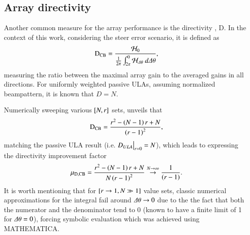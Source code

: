 \subsection*{Array directivity}
Another common measure for the array performance is the directivity \cite{VanTrees2002DetectionIV}, $\text{D}$. In the context of this work, considering the steer error scenario, it is defined as
\begin{equation*}
    \text{D}_{\coefSetName{}} = \frac{\Hr_{0}}{\frac{1}{2\pi}\int^{0}_{2\pi}\Hr_{\dTheta}\ d\dTheta},
\end{equation*}
measuring the ratio between the maximal array gain to the averaged gains in all directions. For uniformly weighted passive ULAs, assuming normalized beampattern, it is known \cite{VanTrees2002DetectionIV} that $D = N$.
\par Numerically sweeping various $\left[{N,r}\right]$ sets, unveils that
\begin{equation}
    \text{D}_{\text{CB}{}} = \frac{r^{2}-\left({N-1}\right)r+N}{\left({r-1}\right)^{2}},
\end{equation}
matching the passive ULA result (i.e. $\evalat{D_{ULA}}{r=0}=N$), which leads to expressing the \coefSetName{} directivity improvement factor 
\begin{equation}
    \mu_{\text{D},\text{CB}{}}= \frac{r^{2}-\left({N-1}\right)r+N}{N\left({r-1}\right)^{2}}\overset{N\to\infty}{\to}\frac{1}{\left({r-1}\right)}.
\end{equation}
It is worth mentioning that for $\left[{r\to1,N\gg1}\right]$ value sets, classic numerical approximations for the integral fail around $\Delta\theta\to0$ due to the the fact that both the numerator and the denominator tend to 0 (known to have a finite limit of 1 for $\Delta\theta=0$), forcing symbolic evaluation which was achieved using MATHEMATICA.